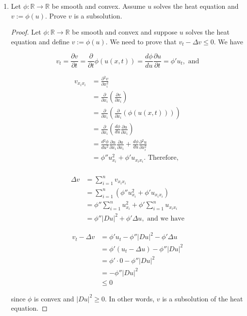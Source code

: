\documentclass[11pt,oneside,english]{amsart}
\theoremstyle{definition}
\newcommand{\dd}[2]{\frac{d{#1}}{d{#2}}}
\newcommand{\pp}[2]{\frac{\partial{#1}}{\partial{#2}}}
\newcommand{\MB}[1]{\mathbb{#1}}
\begin{document}
\begin{enumerate}
\begin{enumerate}
\pagebreak

\item Let $\phi:\MB{R}\rightarrow\MB{R}$ be smooth and convex. Assume $u$ solves the heat equation and $v:=\phi(u)$. Prove $v$ is a subsolution.

\begin{proof}
Let $\phi:\MB{R}\rightarrow\MB{R}$ be smooth and convex and suppose $u$ solves the heat equation and define $v:=\phi(u)$. We need to prove that $v_t-\Delta v\leq 0$. We have

\[
v_t=\pp{v}{t}=\pp{}{t}\phi(u(x,t))=\dd{\phi}{u}\pp{u}{t}=\phi' u_t,\text{ and}
\]

\begin{multicols}{2}
\begin{align*}
v_{x_ix_i}&=\pp{^2v}{x_i^2}\\[2mm]
&=\pp{}{x_i}\left(\pp{v}{x_i}\right)\\[2mm]
&=\pp{}{x_i}\left(\pp{}{x_i}\left(\phi(u(x,t))\right)\right)\\[2mm]
&=\pp{}{x_i}\left(\dd{\phi}{u}\pp{u}{x_i}\right)\\[2mm]
&=\dd{^2\phi}{u^2}\pp{u}{x_i}\pp{u}{x_i}+\dd{\phi}{u}\pp{^2u}{x_i^2}\\[2mm]
&=\phi''u_{x_i}^2+\phi' u_{x_ix_i}.\text{ Therefore,}\\[2mm]
\end{align*}

\columnbreak

\begin{align*}
\Delta v&=\sum_{i=1}^n v_{x_ix_i}\\[2mm]
&=\sum_{i=1}^n\left(\phi''u_{x_i}^2+\phi' u_{x_ix_i}\right)\\[2mm]
&=\phi''\sum_{i=1}^n u_{x_i}^2+\phi'\sum_{i=1}^n u_{x_ix_i}\\[2mm]
&=\phi''|Du|^2+\phi'\Delta u,\text{ and we have}
\end{align*}
\end{multicols}

\begin{align*}
v_t-\Delta v&=\phi' u_t-\phi''|Du|^2-\phi'\Delta u\\[2mm]
&=\phi'(u_t-\Delta u)-\phi''|Du|^2\\[2mm]
&=\phi'\cdot0-\phi''|Du|^2\\[2mm]
&=-\phi''|Du|^2\\[2mm]
&\leq0
\end{align*}

since $\phi$ is convex and $|Du|^2\geq0$. In other words, $v$ is a subsolution of the heat equation.
\end{proof}


\end{enumerate}
\end{enumerate}
\end{document}
